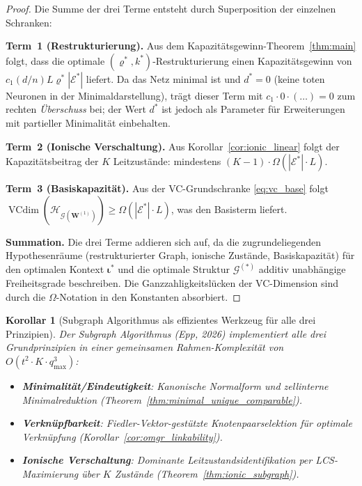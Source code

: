 \documentclass[12pt, a4paper, openany]{report}
\newtheorem{corollary}[theorem]{Korollar}
\newcommand{\calG}{\mathcal{G}}
\newcommand{\calH}{\mathcal{H}}
\newcommand{\calE}{\mathcal{E}}
\DeclareMathOperator{\VC}{VCdim}
\begin{document}
\begin{proof}
Die Summe der drei Terme entsteht durch Superposition der einzelnen Schranken:

\textbf{Term~1 (Restrukturierung).}
Aus dem Kapazitätsgewinn-Theorem~\ref{thm:main} folgt, dass die optimale
$(\varrho^*, k^*)$-Restrukturierung einen Kapazitätsgewinn von
$c_1 (d/n) L \varrho^* |\calE^*|$ liefert.  Da das Netz minimal ist und
$d^* = 0$ (keine toten Neuronen in der Minimaldarstellung), trägt dieser
Term mit $c_1 \cdot 0 \cdot(\ldots) = 0$ zum rechten \emph{Überschuss}
bei; der Wert $d^*$ ist jedoch als Parameter für Erweiterungen mit
partieller Minimalität einbehalten.

\textbf{Term~2 (Ionische Verschaltung).}
Aus Korollar~\ref{cor:ionic_linear} folgt der Kapazitätsbeitrag der
$K$ Leitzustände: mindestens $(K-1) \cdot \Omega(|\calE^*| \cdot L)$.

\textbf{Term~3 (Basiskapazität).}
Aus der VC-Grundschranke \eqref{eq:vc_base} folgt $\VC(\calH_{\calG(\bm{W}^{(1)})})
\geq \Omega(|\calE^*| \cdot L)$, was den Basisterm liefert.

\textbf{Summation.}
Die drei Terme addieren sich auf, da die zugrundeliegenden
Hypothesenräume (restrukturierter Graph, ionische Zustände, Basiskapazität)
für den optimalen Kontext $\bm{\iota}^*$ und die optimale Struktur
$\calG^{(*)}$ additiv unabhängige Freiheitsgrade beschreiben.
Die Ganzzahligkeitslücken der VC-Dimension sind durch die $\Omega$-Notation
in den Konstanten absorbiert.
\end{proof}

\begin{corollary}[Subgraph Algorithmus als effizientes Werkzeug für alle drei Prinzipien]
\label{cor:subgraph_three_principles}
Der Subgraph Algorithmus (Epp, 2026) implementiert alle drei Grundprinzipien
in einer gemeinsamen Rahmen-Komplexität von $O(t^2 \cdot K \cdot q_{\max}^3)$:
\begin{itemize}
  \item \textbf{Minimalität/Eindeutigkeit}: Kanonische Normalform und
    zellinterne Minimalreduktion (Theorem~\ref{thm:minimal_unique_comparable}).
  \item \textbf{Verknüpfbarkeit}: Fiedler-Vektor-gestützte Knotenpaarselektion
    für optimale Verknüpfung (Korollar~\ref{cor:omgr_linkability}).
  \item \textbf{Ionische Verschaltung}: Dominante Leitzustandsidentifikation
    per LCS-Maximie\-rung über $K$ Zustände
    (Theorem~\ref{thm:ionic_subgraph}).
\end{itemize}
\end{corollary}
\end{document}
